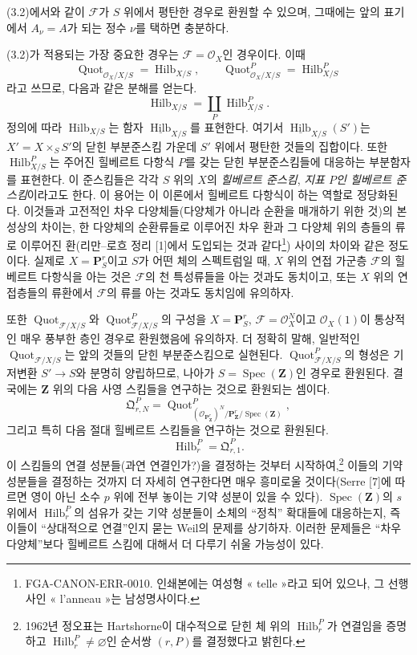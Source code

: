 (3.2)에서와 같이 $\mathcal F$가 $S$ 위에서 평탄한 경우로 환원할 수
있으며, 그때에는 앞의 표기에서 $A_\nu=A$가 되는 정수 $\nu$를 택하면
충분하다.

(3.2)가 적용되는 가장 중요한 경우는 $\mathcal F=\mathcal O_X$인
경우이다. 이때
\[
\operatorname{Quot}_{\mathcal O_X/X/S}=\operatorname{Hilb}_{X/S},
\qquad
\operatorname{Quot}^P_{\mathcal O_X/X/S}=\operatorname{Hilb}^P_{X/S}
\]
라고 쓰므로, 다음과 같은 분해를 얻는다.
\[
\operatorname{Hilb}_{X/S}=\coprod_P\operatorname{Hilb}^P_{X/S}.
\]
정의에 따라 $\operatorname{Hilb}_{X/S}$는 함자
$\underline{\operatorname{Hilb}}_{X/S}$를 표현한다. 여기서
$\underline{\operatorname{Hilb}}_{X/S}(S')$는
$X'=X\times_SS'$의 닫힌 부분준스킴 가운데 $S'$ 위에서 평탄한 것들의
집합이다. 또한 $\operatorname{Hilb}^P_{X/S}$는 주어진 힐베르트
다항식 $P$를 갖는 닫힌 부분준스킴들에 대응하는 부분함자를 표현한다.
이 준스킴들은 각각 $S$ 위의 $X$의 \emph{힐베르트 준스킴},
\emph{지표 $P$인 힐베르트 준스킴}이라고도 한다. 이 용어는 이 이론에서
힐베르트 다항식이 하는 역할로 정당화된다. 이것들과 고전적인 차우
다양체들(다양체가 아니라 순환을 매개하기 위한 것)의 본성상의 차이는,
한 다양체의 순환류들로 이루어진 차우 환과 그 다양체 위의 층들의 류로
이루어진 환(리만--로흐 정리 [1]에서 도입되는 것과
같다\footnote{FGA-CANON-ERR-0010. 인쇄본에는 여성형 « telle »라고 되어
있으나, 그 선행사인 « l'anneau »는 남성명사이다.}) 사이의 차이와 같은
정도이다. 실제로 $X=\mathbf P^r_S$이고 $S$가 어떤 체의 스펙트럼일 때,
$X$ 위의 연접 가군층 $\mathcal F$의 힐베르트 다항식을 아는 것은
$\mathcal F$의 천 특성류들을 아는 것과도 동치이고, 또는 $X$ 위의 연접층들의
류환에서 $\mathcal F$의 류를 아는 것과도 동치임에 유의하자.

 또한 $\operatorname{Quot}_{\mathcal F/X/S}$와
$\operatorname{Quot}^P_{\mathcal F/X/S}$의 구성을
$X=\mathbf P^r_S$, $\mathcal F=\mathcal O_X^N$이고
$\mathcal O_X(1)$이 통상적인 매우 풍부한 층인 경우로 환원했음에
유의하자. 더 정확히 말해, 일반적인
$\operatorname{Quot}_{\mathcal F/X/S}$는 앞의 것들의 닫힌
부분준스킴으로 실현된다. $\operatorname{Quot}^P_{\mathcal F/X/S}$의
형성은 기저변환 $S'\longrightarrow S$와 분명히 양립하므로, 나아가
$S=\operatorname{Spec}(\mathbf Z)$인 경우로 환원된다. 결국에는
$\mathbf Z$ 위의 다음 사영 스킴들을 연구하는 것으로 환원되는 셈이다.
\[
\mathfrak Q^P_{r,N}=
\operatorname{Quot}^{P}_{(\mathcal O_{\mathbf P^r_{\mathbf Z}})^N/
\mathbf P^r_{\mathbf Z}/\operatorname{Spec}(\mathbf Z)},
\]
그리고 특히 다음 절대 힐베르트 스킴들을 연구하는 것으로 환원된다.
\[
\operatorname{Hilb}^P_r=\mathfrak Q^P_{r,1}.
\]
이 스킴들의 연결 성분들(과연 연결인가?)을 결정하는 것부터
시작하여,\footnote{1962년 정오표는 Hartshorne이 대수적으로 닫힌 체 위의
$\operatorname{Hilb}^P_r$가 연결임을 증명하고
$\operatorname{Hilb}^P_r\neq\varnothing$인 순서쌍 $(r,P)$를 결정했다고
밝힌다.} 이들의 기약 성분들을 결정하는 것까지 더 자세히 연구한다면 매우
흥미로울 것이다(Serre [7]에 따르면 영이 아닌 소수 $p$ 위에 전부 놓이는
기약 성분이 있을 수 있다). $\operatorname{Spec}(\mathbf Z)$의
$s$ 위에서 $\operatorname{Hilb}^P_r$의 섬유가 갖는 기약 성분들이
소체의 ``정칙'' 확대들에 대응하는지, 즉 이들이 ``상대적으로 연결''인지
묻는 Weil의 문제를 상기하자. 이러한 문제들은 ``차우 다양체''보다
힐베르트 스킴에 대해서 더 다루기 쉬울 가능성이 있다.

